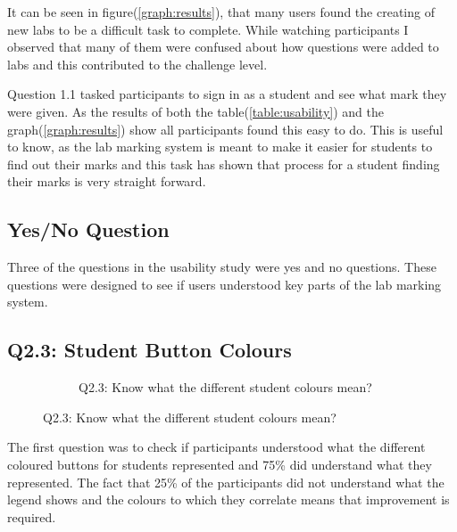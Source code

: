\documentclass[11pt]{report}
\begin{document}
It can be seen in figure(\ref{graph:results}), that many users found the creating of new labs to be a difficult task to complete. While watching participants I observed that many of them were confused about how questions were added to labs and this contributed to the challenge level.

Question 1.1 tasked participants to sign in as a student and see what mark they were given. As the results of both the table(\ref{table:usability}) and the graph(\ref{graph:results}) show all participants found this  easy to do. This is useful to know, as the lab marking system is meant to make it easier for students to find out their marks and this task has shown that process for a student finding their marks is very straight forward.


\subsection*{Yes/No Question}
Three of the questions in the usability study were yes and no questions. These questions were designed to see if users understood key parts of the lab marking system.


\newpage
\subsection*{Q2.3: Student Button Colours}

\begin{figure}
\vspace*{-\baselineskip}
\begin{figure}[H]
\caption{Q2.3: Know what the different student colours mean?}


\end{figure}
\end{figure}

The first question was to check if participants understood what the different coloured buttons for students represented and 75\% did understand what they represented. The fact that 25\% of the participants did not understand what the legend shows and the colours to which they correlate means that improvement is required.
\end{document}
